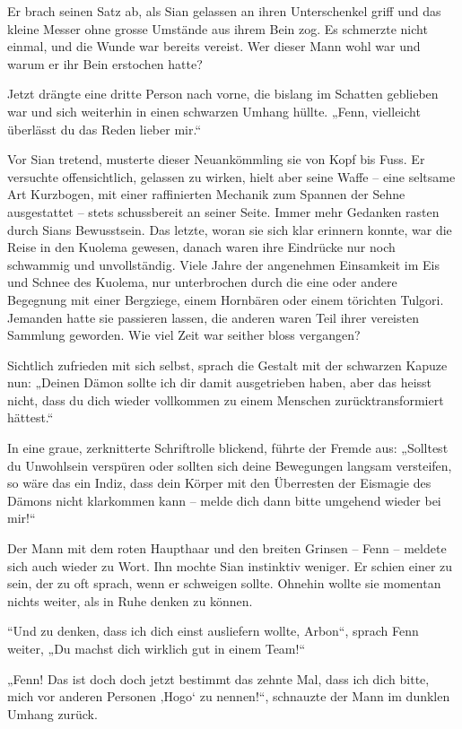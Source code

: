 \documentclass[10pt, a4paper, oneside]{book}
\begin{document}
Er brach seinen Satz ab, als Sian gelassen an ihren Unterschenkel griff und das kleine Messer ohne grosse Umstände aus ihrem Bein zog. Es schmerzte nicht einmal, und die Wunde war bereits vereist. Wer dieser Mann wohl war und warum er ihr Bein erstochen hatte?

Jetzt drängte eine dritte Person nach vorne, die bislang im Schatten geblieben war und sich weiterhin in einen schwarzen Umhang hüllte. „Fenn, vielleicht überlässt du das Reden lieber mir.“

Vor Sian tretend, musterte dieser Neuankömmling sie von Kopf bis Fuss. Er versuchte offensichtlich, gelassen zu wirken, hielt aber seine Waffe – eine seltsame Art Kurzbogen, mit einer raffinierten Mechanik zum Spannen der Sehne ausgestattet – stets schussbereit an seiner Seite. Immer mehr Gedanken rasten durch Sians Bewusstsein. Das letzte, woran sie sich klar erinnern konnte, war die Reise in den Kuolema gewesen, danach waren ihre Eindrücke nur noch schwammig und unvollständig. Viele Jahre der angenehmen Einsamkeit im Eis und Schnee des Kuolema, nur unterbrochen durch die eine oder andere Begegnung mit einer Bergziege, einem Hornbären oder einem törichten Tulgori. Jemanden hatte sie passieren lassen, die anderen waren Teil ihrer vereisten Sammlung geworden. Wie viel Zeit war seither bloss vergangen?

Sichtlich zufrieden mit sich selbst, sprach die Gestalt mit der schwarzen Kapuze nun: „Deinen Dämon sollte ich dir damit ausgetrieben haben, aber das heisst nicht, dass du dich wieder vollkommen zu einem Menschen zurücktransformiert hättest.“

In eine graue, zerknitterte Schriftrolle blickend, führte der Fremde aus: „Solltest du Unwohlsein verspüren oder sollten sich deine Bewegungen langsam versteifen, so wäre das ein Indiz, dass dein Körper mit den Überresten der Eismagie des Dämons nicht klarkommen kann – melde dich dann bitte umgehend wieder bei mir!“

Der Mann mit dem roten Haupthaar und den breiten Grinsen – Fenn – meldete sich auch wieder zu Wort. Ihn mochte Sian instinktiv weniger. Er schien einer zu sein, der zu oft sprach, wenn er schweigen sollte. Ohnehin wollte sie momentan nichts weiter, als in Ruhe denken zu können.

“Und zu denken, dass ich dich einst ausliefern wollte, Arbon“, sprach Fenn weiter, „Du machst dich wirklich gut in einem Team!“ 

„Fenn! Das ist doch doch jetzt bestimmt das zehnte Mal, dass ich dich bitte, mich vor anderen Personen ‚Hogo‘ zu nennen!“, schnauzte der Mann im dunklen Umhang zurück. 
\end{document}
